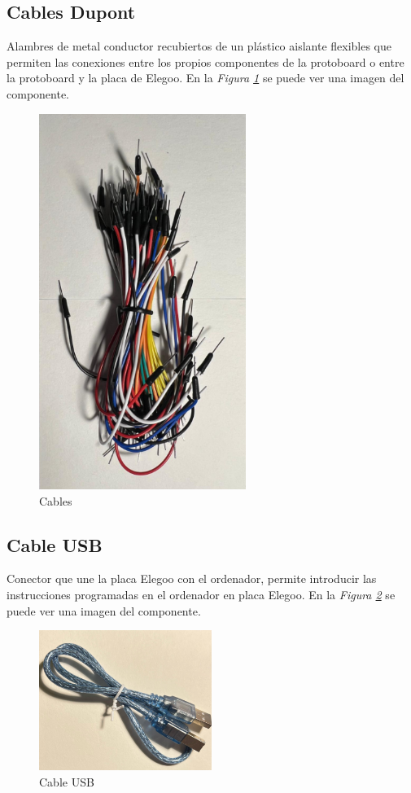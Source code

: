 \subsection{Cables Dupont}
Alambres de metal conductor recubiertos de un plástico aislante flexibles que permiten las conexiones entre los propios componentes de la protoboard o entre la protoboard y la placa de Elegoo. En la \textit{Figura \ref{fig:cable_dupont}} se puede ver una imagen del componente.
\begin{figure}[h]
        \centering
        \includegraphics[angle=90,width=0.6\textwidth]{img/cable_dupont.png}
        \caption{Cables}
        \label{fig:cable_dupont}
    \end{figure}
   
\subsection{Cable USB}
Conector que une la placa Elegoo con el ordenador, permite introducir las instrucciones programadas en el ordenador en placa Elegoo. En la \textit{Figura \ref{fig:Cable USB}} se puede ver una imagen del componente.
\begin{figure}[h]
        \centering
        \includegraphics[width=0.5\textwidth]{img/cable usb.png}
        \caption{Cable USB}
        \label{fig:Cable USB}
    \end{figure}
   
